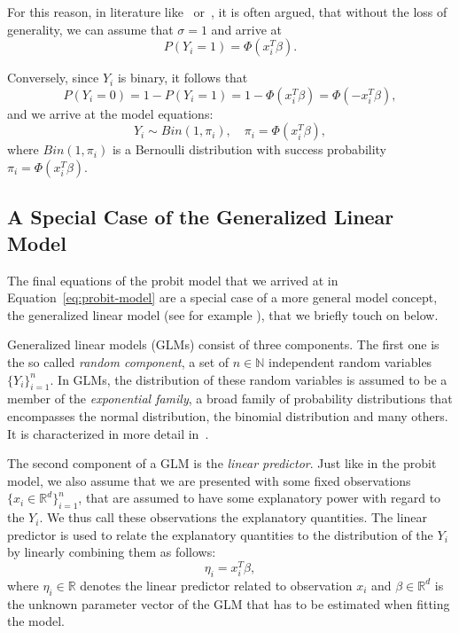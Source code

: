 For this reason, in literature like~\cite{regression-fahrmeir}
or~\cite{glm-agresti}, it is
often argued, that without the loss of generality, we can assume that
$\sigma = 1$ and arrive at
\begin{equation*}
    P(Y_i = 1) = \Phi(x_i^T \beta).
\end{equation*}

\noindent{}Conversely, since $Y_i$ is binary, it follows that
\begin{equation*}
    P(Y_i = 0) = 1 - P(Y_i = 1) = 1 - \Phi(x_i^T \beta) = \Phi(-x_i^T \beta),
\end{equation*}
and we arrive at the model equations:
\begin{equation}
    \label{eq:probit-model}
    Y_i \sim Bin(1, \pi_i), \quad \pi_i = \Phi(x_i^T \beta),
\end{equation}
where $Bin(1, \pi_i)$ is a Bernoulli distribution with success
probability $\pi_i = \Phi(x_i^T \beta)$.

\subsection{A Special Case of the Generalized Linear Model}

The final equations of the probit model that we arrived at
in Equation~\ref{eq:probit-model} are a special case of a more
general model concept, the generalized linear model
(see for example \cite{glm-nelder}),
that we briefly touch on below.

Generalized linear models (GLMs) consist of three components.
The first one is the so called \textit{random component},
a set of $n \in \mathbb{N}$ independent random variables $\{ Y_i \}_{i=1}^n$.
In GLMs, the distribution of these random variables is assumed
to be a member of the \textit{exponential family}, a broad family of
probability distributions that encompasses the normal distribution,
the binomial distribution and many others.
It is characterized in more detail in~\cite{glm-agresti}.

The second component of a GLM is the \textit{linear predictor}.
Just like in the probit model, we also assume that we are
presented with some fixed observations $\{x_i \in \mathbb{R}^d\}_{i=1}^n$,
that are assumed to have some explanatory power with regard to
the $Y_i$. We thus call these observations the explanatory quantities.
The linear predictor is used to relate the explanatory quantities
to the distribution of the $Y_i$ by linearly combining them as follows:
\begin{equation*}
    \eta_i = x_i^T \beta,
\end{equation*}
where $\eta_i \in \mathbb{R}$ denotes the linear predictor related
to observation $x_i$ and
$\beta \in \mathbb{R}^d$ is the unknown parameter vector of the GLM
that has to be estimated when fitting the model.

